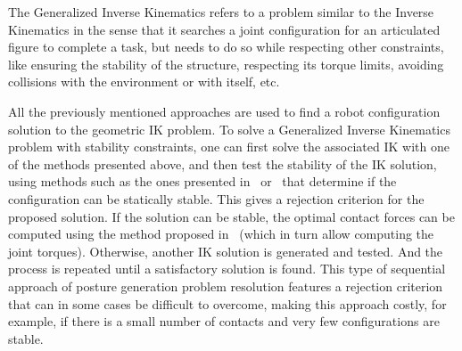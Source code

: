 The Generalized Inverse Kinematics refers to a problem similar to the Inverse Kinematics in the sense that it searches a joint configuration for an articulated figure to complete a task, but needs to do so while respecting other constraints, like ensuring the stability of the structure, respecting its torque limits, avoiding collisions with the environment or with itself, etc.

All the previously mentioned approaches are used to find a robot configuration solution to the geometric IK problem.
To solve a Generalized Inverse Kinematics problem with stability constraints, one can first solve the associated IK with one of the methods presented above, and then test the stability of the IK solution, using methods such as the ones presented in~\cite{bretl:itro:2008} or~\cite{rimon2008general} that determine if the configuration can be statically stable.
This gives a rejection criterion for the proposed solution.
If the solution can be stable, the optimal contact forces can be computed using the method proposed in~\cite{boyd2007fast} (which in turn allow computing the joint torques).
Otherwise, another IK solution is generated and tested.
And the process is repeated until a satisfactory solution is found.
This type of sequential approach of posture generation problem resolution features a rejection criterion that can in some cases be difficult to overcome, making this approach costly, for example, if there is a small number of contacts and very few configurations are stable.


